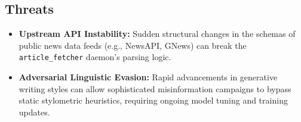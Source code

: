 \subsection{Threats}
\begin{itemize}
    \item \textbf{Upstream API Instability:} Sudden structural changes in the schemas of public news data feeds (e.g., NewsAPI, GNews) can break the \texttt{article\_fetcher} daemon's parsing logic.
    \item \textbf{Adversarial Linguistic Evasion:} Rapid advancements in generative writing styles can allow sophisticated misinformation campaigns to bypass static stylometric heuristics, requiring ongoing model tuning and training updates.
\end{itemize}
